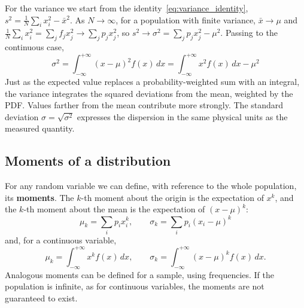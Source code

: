 \documentclass[letterpaper,11pt,leqno]{book}
\begin{document}
For the variance we start from the identity~\eqref{eq:variance_identity}, $s^2 = \frac{1}{N}\sum_i x_i^2 - \bar{x}^2$. As $N \to \infty$, for a population with finite variance, $\bar{x} \to \mu$ and $\frac{1}{N}\sum_i x_i^2 = \sum_j f_jx_j^2 \to \sum_j p_jx_j^2$, so $s^2 \to \sigma^2 = \sum_j p_jx_j^2 - \mu^2$. Passing to the continuous case,
\begin{equation}
\boxed{\sigma^2 = \int_{-\infty}^{+\infty}(x - \mu)^2f(x)\,dx = \int_{-\infty}^{+\infty}x^2f(x)\,dx - \mu^2}
\label{eq:variance_continuous}
\end{equation}
Just as the expected value replaces a probability-weighted sum with an integral, the variance integrates the squared deviations from the mean, weighted by the PDF. Values farther from the mean contribute more strongly. The standard deviation $\sigma = \sqrt{\sigma^2}$ expresses the dispersion in the same physical units as the measured quantity.

\subsection{Moments of a distribution}

For any random variable we can define, with reference to the whole population, its \textbf{moments}. The $k$-th moment about the origin is the expectation of $x^k$, and the $k$-th moment about the mean is the expectation of $(x - \mu)^k$:
\begin{equation}
\boxed{\mu_k = \sum_i p_ix_i^k, \qquad \sigma_k = \sum_i p_i(x_i - \mu)^k}
\label{eq:moments_discrete}
\end{equation}
and, for a continuous variable,
\begin{equation}
\mu_k = \int_{-\infty}^{+\infty}x^kf(x)\,dx, \qquad \sigma_k = \int_{-\infty}^{+\infty}(x - \mu)^kf(x)\,dx.
\label{eq:moments_continuous}
\end{equation}
Analogous moments can be defined for a sample, using frequencies. If the population is infinite, as for continuous variables, the moments are not guaranteed to exist.
\end{document}
